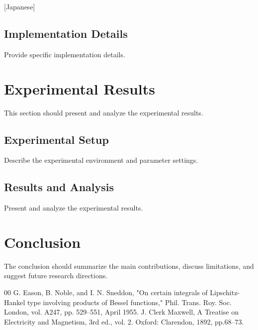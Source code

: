 [Japanese] \documentclass[conference,twocolumn]{IEEEtran}
\begin{document}
\subsection{Implementation Details}
Provide specific implementation details.

\section{Experimental Results}
This section should present and analyze the experimental results.

\subsection{Experimental Setup}
Describe the experimental environment and parameter settings.

\subsection{Results and Analysis}
Present and analyze the experimental results.

\section{Conclusion}
The conclusion should summarize the main contributions, discuss limitations,
and suggest future research directions.

\begin{thebibliography}{00}
 G. Eason, B. Noble, and I. N. Sneddon, "On certain integrals of
Lipschitz-Hankel type involving products of Bessel functions," Phil. Trans. Roy. Soc. London, vol. A247, pp. 529--551, April 1955.
 J. Clerk Maxwell, A Treatise on Electricity and Magnetism, 3rd ed., vol. 2. Oxford: Clarendon, 1892, pp.68--73.
\end{thebibliography}
\end{document}
